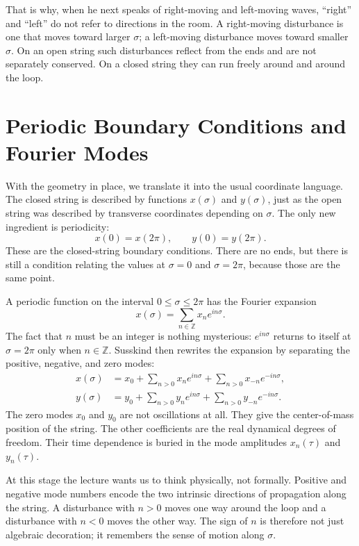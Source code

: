 That is why, when he next speaks of right-moving and left-moving waves, ``right'' and ``left'' do not refer to directions in the room. A right-moving disturbance is one that moves toward larger \(\sigma\); a left-moving disturbance moves toward smaller \(\sigma\). On an open string such disturbances reflect from the ends and are not separately conserved. On a closed string they can run freely around and around the loop.

\section{Periodic Boundary Conditions and Fourier Modes}

With the geometry in place, we translate it into the usual coordinate language. The closed string is described by functions \(x(\sigma)\) and \(y(\sigma)\), just as the open string was described by transverse coordinates depending on \(\sigma\). The only new ingredient is periodicity:
\begin{equation}
x(0)=x(2\pi),
\qquad
y(0)=y(2\pi).
\end{equation}
These are the closed-string boundary conditions. There are no ends, but there is still a condition relating the values at \(\sigma=0\) and \(\sigma=2\pi\), because those are the same point.

A periodic function on the interval \(0\leq \sigma\leq 2\pi\) has the Fourier expansion
\begin{equation}
x(\sigma)=\sum_{n\in\mathbb Z} x_n e^{in\sigma}.
\end{equation}
The fact that \(n\) must be an integer is nothing mysterious: \(e^{in\sigma}\) returns to itself at \(\sigma=2\pi\) only when \(n\in\mathbb Z\). Susskind then rewrites the expansion by separating the positive, negative, and zero modes:
\begin{align}
x(\sigma)
&=
x_0+\sum_{n>0}x_n e^{in\sigma}+\sum_{n>0}x_{-n}e^{-in\sigma},
\\[4pt]
y(\sigma)
&=
y_0+\sum_{n>0}y_n e^{in\sigma}+\sum_{n>0}y_{-n}e^{-in\sigma}.
\end{align}
The zero modes \(x_0\) and \(y_0\) are not oscillations at all. They give the center-of-mass position of the string. The other coefficients are the real dynamical degrees of freedom. Their time dependence is buried in the mode amplitudes \(x_n(\tau)\) and \(y_n(\tau)\).

At this stage the lecture wants us to think physically, not formally. Positive and negative mode numbers encode the two intrinsic directions of propagation along the string. A disturbance with \(n>0\) moves one way around the loop and a disturbance with \(n<0\) moves the other way. The sign of \(n\) is therefore not just algebraic decoration; it remembers the sense of motion along \(\sigma\).

